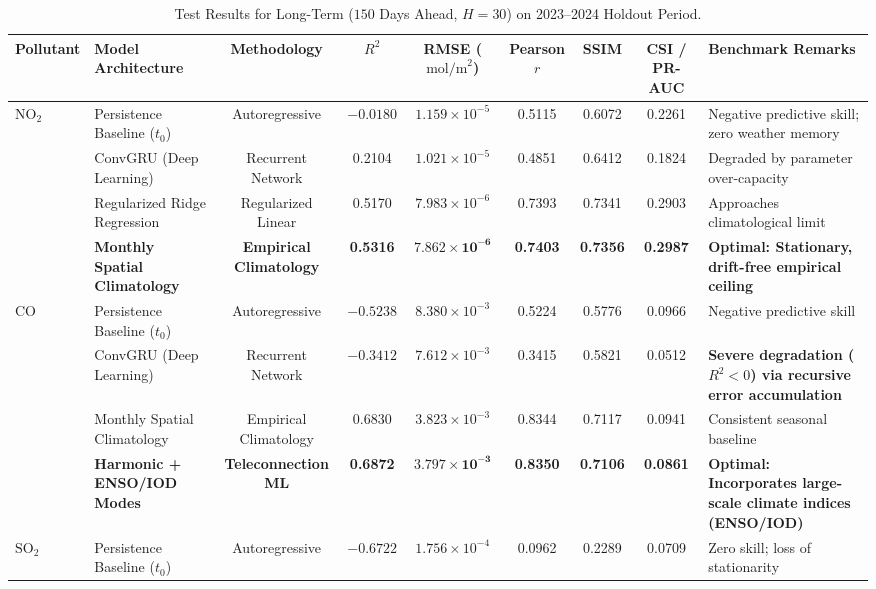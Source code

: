 ﻿\documentclass[10pt,a4paper]{article}
\begin{document}
\begin{table}[htbp]
\centering
\small
\caption{Test Results for Long-Term ($150$ Days Ahead, $H=30$) on 2023--2024 Holdout Period.}
\label{tab:long_term}
\begin{tabularx}{\textwidth}{llccccccX}
\toprule
\textbf{Pollutant} & \textbf{Model Architecture} & \textbf{Methodology} & \textbf{$R^2$} & \textbf{RMSE ($\text{mol/m}^2$)} & \textbf{Pearson $r$} & \textbf{SSIM} & \textbf{CSI / PR-AUC} & \textbf{Benchmark Remarks} \\
\midrule
\multirow{4}{*}{\textbf{$\text{NO}_2$}} 
& Persistence Baseline ($t_0$) & Autoregressive & $-0.0180$ & $1.159 \times 10^{-5}$ & 0.5115 & 0.6072 & 0.2261 & Negative predictive skill; zero weather memory \\
& ConvGRU (Deep Learning) & Recurrent Network & 0.2104 & $1.021 \times 10^{-5}$ & 0.4851 & 0.6412 & 0.1824 & Degraded by parameter over-capacity \\
& Regularized Ridge Regression & Regularized Linear & 0.5170 & $7.983 \times 10^{-6}$ & 0.7393 & 0.7341 & 0.2903 & Approaches climatological limit \\
& \textbf{Monthly Spatial Climatology} & \textbf{Empirical Climatology} & \textbf{0.5316} & $\mathbf{7.862 \times 10^{-6}}$ & \textbf{0.7403} & \textbf{0.7356} & \textbf{0.2987} & \textbf{Optimal: Stationary, drift-free empirical ceiling} \\
\midrule
\multirow{4}{*}{\textbf{$\text{CO}$}} 
& Persistence Baseline ($t_0$) & Autoregressive & $-0.5238$ & $8.380 \times 10^{-3}$ & 0.5224 & 0.5776 & 0.0966 & Negative predictive skill \\
& ConvGRU (Deep Learning) & Recurrent Network & $\mathbf{-0.3412}$ & $7.612 \times 10^{-3}$ & 0.3415 & 0.5821 & 0.0512 & \textbf{Severe degradation ($R^2 < 0$) via recursive error accumulation} \\
& Monthly Spatial Climatology & Empirical Climatology & 0.6830 & $3.823 \times 10^{-3}$ & 0.8344 & 0.7117 & 0.0941 & Consistent seasonal baseline \\
& \textbf{Harmonic + ENSO/IOD Modes} & \textbf{Teleconnection ML} & \textbf{0.6872} & $\mathbf{3.797 \times 10^{-3}}$ & \textbf{0.8350} & \textbf{0.7106} & \textbf{0.0861} & \textbf{Optimal: Incorporates large-scale climate indices (ENSO/IOD)} \\
\midrule
\multirow{4}{*}{\textbf{$\text{SO}_2$}} 
& Persistence Baseline ($t_0$) & Autoregressive & $-0.6722$ & $1.756 \times 10^{-4}$ & 0.0962 & 0.2289 & 0.0709 & Zero skill; loss of stationarity \\

\end{tabularx}
\end{table}
\end{document}
